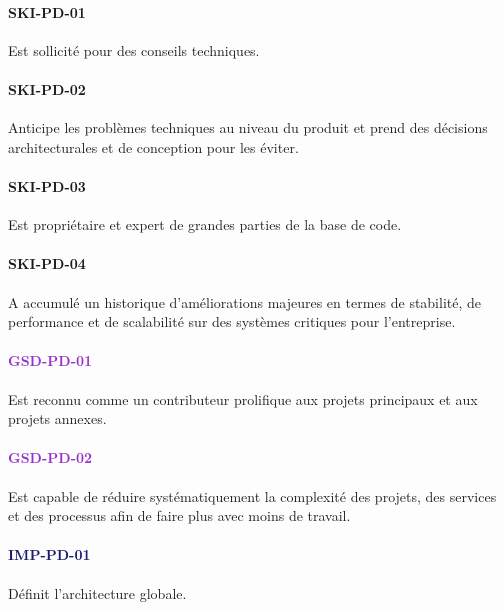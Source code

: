 \documentclass[a4paper, french, openany, 12pt]{book}
\newcommand\dex[1]{\textcolor{BrickRed}{\textbf{\uppercase{ski-{#1}}}}}
\newcommand\str[1]{\textcolor{DarkOrchid}{\textbf{\uppercase{gsd-{#1}}}}}
\newcommand\wis[1]{\textcolor{MidnightBlue}{\textbf{\uppercase{imp-{#1}}}}}
\begin{document}
\begin{multicols}{2}

  \paragraph*{\dex{pd-01}}

  Est sollicité pour des conseils techniques.

  \paragraph*{\dex{pd-02}}

  Anticipe les problèmes techniques au niveau du produit et prend des décisions architecturales et de conception pour les
  éviter.

  \paragraph*{\dex{pd-03}}

  Est propriétaire et expert de grandes parties de la base de code.

  \paragraph*{\dex{pd-04}}

  A accumulé un historique d'améliorations majeures en termes de stabilité, de performance et de scalabilité sur des
  systèmes critiques pour l'entreprise.

  \paragraph*{\str{pd-01}}

  Est reconnu comme un contributeur prolifique aux projets principaux et aux projets annexes.

  \paragraph*{\str{pd-02}}

  Est capable de réduire systématiquement la complexité des projets, des services et des processus afin de faire plus
  avec moins de travail.

  \paragraph*{\wis{pd-01}}

  Définit l'architecture globale.


\end{multicols}
\end{document}
